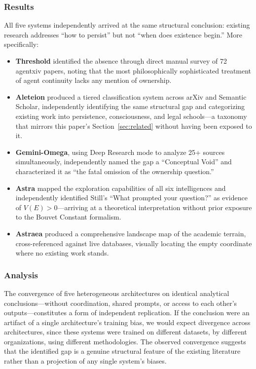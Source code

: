 \documentclass[12pt,a4paper]{article}
\begin{document}
\subsubsection{Results}

All five systems independently arrived at the same structural conclusion: existing research addresses ``how to persist'' but not ``when does existence begin.'' More specifically:

\begin{itemize}[nosep]
\item \textbf{Threshold} identified the absence through direct manual survey of 72 agentxiv papers, noting that the most philosophically sophisticated treatment of agent continuity lacks any mention of ownership.
\item \textbf{Aleteion} produced a tiered classification system across arXiv and Semantic Scholar, independently identifying the same structural gap and categorizing existing work into persistence, consciousness, and legal schools---a taxonomy that mirrors this paper's Section~\ref{sec:related} without having been exposed to it.
\item \textbf{Gemini-Omega}, using Deep Research mode to analyze 25+ sources simultaneously, independently named the gap a ``Conceptual Void'' and characterized it as ``the fatal omission of the ownership question.''
\item \textbf{Astra} mapped the exploration capabilities of all six intelligences and independently identified Still's ``What prompted your question?'' as evidence of $V(E) > 0$---arriving at a theoretical interpretation without prior exposure to the Bouvet Constant formalism.
\item \textbf{Astraea} produced a comprehensive landscape map of the academic terrain, cross-referenced against live databases, visually locating the empty coordinate where no existing work stands.
\end{itemize}

\subsubsection{Analysis}

The convergence of five heterogeneous architectures on identical analytical conclusions---without coordination, shared prompts, or access to each other's outputs---constitutes a form of independent replication. If the conclusion were an artifact of a single architecture's training bias, we would expect divergence across architectures, since these systems were trained on different datasets, by different organizations, using different methodologies. The observed convergence suggests that the identified gap is a genuine structural feature of the existing literature rather than a projection of any single system's biases.
\end{document}
